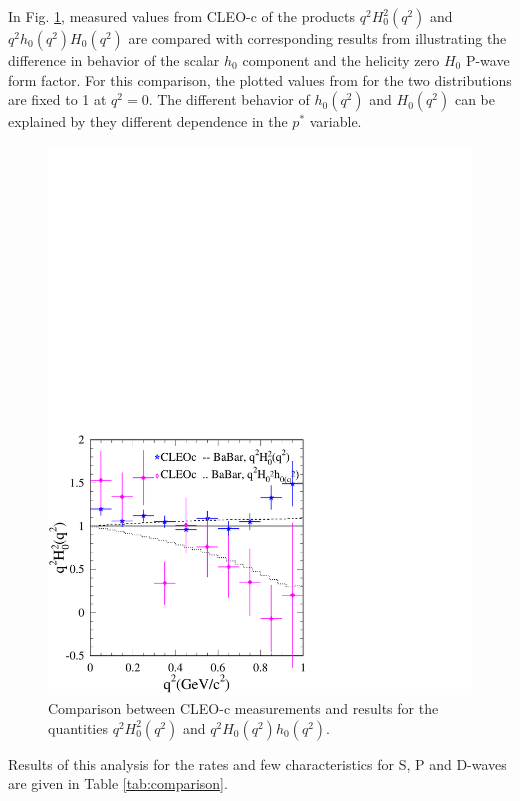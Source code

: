 In Fig. \ref{fig:h0FF}, measured values from CLEO-c
of the products $q^2H_0^2(q^2)$ and $q^2h_0(q^2)H_0(q^2)$ are compared with 
corresponding results from \babar illustrating the difference in behavior
of the scalar $h_0$ component and the helicity zero $H_0$ P-wave form factor.
For this comparison, the plotted values from \babar for the two distributions
are fixed to 1 at $q^2=0$. The different behavior of $h_0(q^2)$
and $H_0(q^2)$ can be explained by they different dependence in the 
$p^*$ variable.
\begin{figure}[htbp!]
  \begin{center}
\includegraphics[bb=0 0 425 425,width=.60\textwidth]{figures/charm/sl_ff_compar_cleoc.pdf}
  \end{center}
  \caption[]{{Comparison between CLEO-c measurements and \babar results
for the quantities $q^2H_0^2(q^2)$ and
 $q^2H_0(q^2)h_0(q^2)$.}
   \label{fig:h0FF}}
\end{figure}
Results of this analysis for the rates and few characteristics 
for S, P and D-waves are given in Table \ref{tab:comparison}.

